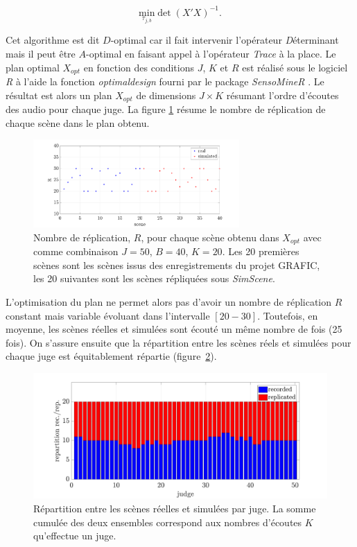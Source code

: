 \begin{equation}\label{eq:mini_det_BIE}
\underset{\tau_{j,b}}{\text{min}} \det(X'X)^{-1}.
\end{equation}

Cet algorithme est dit $D$-optimal car il fait intervenir l'opérateur \textit{D}éterminant mais il peut être $A$-optimal en faisant appel à l'opérateur \textit{Trace} à la place. Le plan optimal $X_{opt}$ en fonction des conditions $J$, $K$ et $R$ est réalisé sous le logiciel \textit{R} à l'aide la fonction \textit{optimaldesign} fourni par le package \textit{SensoMineR} \cite{le_sensominer:_2008}. Le résultat est alors un plan $X_{opt}$ de dimensions $J \times K$ résumant l'ordre d'écoutes des audio pour chaque juge. La figure \ref{fig:replication} résume le nombre de réplication de chaque scène dans le plan obtenu.\\

\begin{figure}[ht]
\centering
\includegraphics[width = 0.7\textwidth]{./figures/test_perceptif/nb_replication.pdf}
\caption{Nombre de réplication, $R$, pour chaque scène obtenu dans $X_{opt}$ avec comme combinaison $J = 50$, $B = 40$, $K = 20$. Les 20 premières scènes sont les scènes issus des enregistrements du projet GRAFIC, les 20 suivantes sont les scènes répliquées sous \textit{SimScene}.}
\label{fig:replication}
\end{figure}

L'optimisation du plan ne permet alors pas d'avoir un nombre de réplication $R$ constant mais variable évoluant dans l'intervalle $\left[20-30 \right]$. Toutefois, en moyenne, les scènes réelles et simulées sont écouté un même nombre de fois (25 fois). On s'assure ensuite que la répartition entre les scènes réels et simulées pour chaque juge est équitablement répartie (figure~\ref{fig:repartition}).\\

\begin{figure}[ht]
\centering
\includegraphics[width = .7\textwidth]{./figures/test_perceptif/repartition-real-simulated.pdf}
\caption{Répartition entre les scènes réelles et simulées par juge. La somme cumulée des deux ensembles correspond aux nombres d'écoutes $K$ qu'effectue un juge.}
\label{fig:repartition}
\end{figure}

